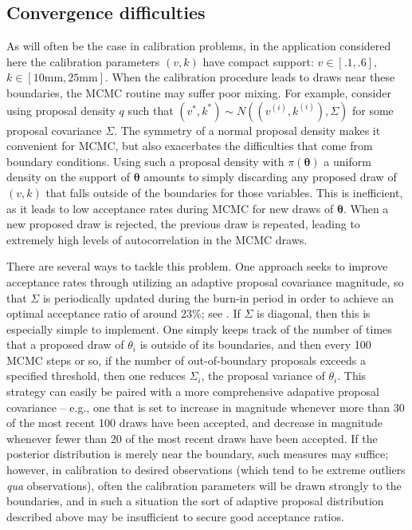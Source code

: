 \documentclass{article}
\begin{document}
\subsection{Convergence difficulties}\label{convergence_difficulties}
As will often be the case in calibration problems, in the application considered here the calibration parameters $(v,k)$ have compact support: $v\in [.1,.6],$ $k\in [10\mathrm{mm},25\mathrm{mm}]$.
When the calibration procedure leads to draws near these boundaries, the MCMC routine may suffer poor mixing. For example, consider using proposal density $q$ such that $(v^*,k^*)\sim N((v^{(i)},k^{(i)}),\Sigma)$ for some proposal covariance $\Sigma$. 
The symmetry of a normal proposal density makes it convenient for MCMC, but also exacerbates the difficulties that come from boundary conditions. 
Using such a proposal density with $\pi(\boldsymbol \theta)$ a uniform density on the support of $\boldsymbol \theta$ amounts to simply discarding any proposed draw of $(v,k)$ that falls outside of the boundaries for those variables. 
This is inefficient, as it leads to low acceptance rates during MCMC for new draws of $\boldsymbol \theta$. 
When a new proposed draw is rejected, the previous draw is repeated, leading to extremely high levels of autocorrelation in the MCMC draws.


There are several ways to tackle this problem. 
One approach seeks to improve acceptance rates through utilizing an adaptive proposal covariance magnitude, so that $\Sigma$ is periodically updated during the burn-in period in order to achieve an optimal acceptance ratio of around 23\%; see \cite{Roberts1997}. 
If $\Sigma$ is diagonal, then this is especially simple to implement. 
One simply keeps track of the number of times that a proposed draw of $\theta_i$ is outside of its boundaries, and then every 100 MCMC steps or so, if the number of out-of-boundary proposals exceeds a specified threshold, then one reduces $\Sigma_i$, the proposal variance of $\theta_i$. 
This strategy can easily be paired with a more comprehensive adapative proposal covariance -- e.g., one that is set to increase in magnitude whenever more than 30 of the most recent 100 draws have been accepted, and decrease in magnitude whenever fewer than 20 of the most recent draws have been accepted. 
If the posterior distribution is merely near the boundary, such measures may suffice; however, in calibration to desired observations (which tend to be extreme outliers \textit{qua} observations), often the calibration parameters will be drawn strongly to the boundaries, and in such a situation the sort of adaptive proposal distribution described above may be insufficient to secure good acceptance ratios. 
\end{document}
